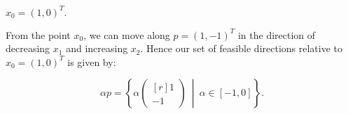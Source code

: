$x_0 = (1, 0)^T.$

\begin{solution}
  From the point $x_0$, we can move along $p = (1, -1)^T$ in the direction of decreasing $x_1$ and increasing $x_2$.
  Hence our set of feasible directions relative to $x_0 = (1, 0)^T$ is given by:

  $$
  \alpha p = \left\{ \alpha \begin{pmatrix*}[r] 1 \\ -1 \end{pmatrix*} \ \middle| \ \alpha \in [-1, 0] \right\}.
  $$
  \ \\
\end{solution}